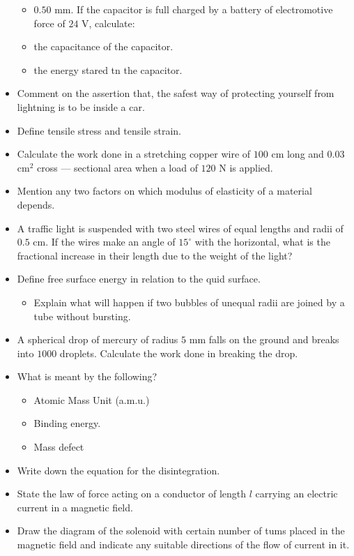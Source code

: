\documentclass{article}
\begin{document}
\begin{itemize}
\begin{itemize}
\item $ 0.50$ mm. If the capacitor is full charged by a battery of electromotive force of $ 24$ V, calculate:
\item the capacitance of the capacitor. 
\item the energy stared tn the capacitor. 
\end{itemize}
\item Comment on the assertion that, the safest way of protecting yourself from lightning is to be inside a car. 
\item Define tensile stress and tensile strain. 
\item Calculate the work done in a stretching copper wire of $ 100$ cm long and $ 0.03 $ cm$ ^{2}$ cross — sectional area when a load of $ 120$ N is applied. 
\item Mention any two factors on which modulus of elasticity of a material depends.
\item A traffic light is suspended with two steel wires of equal lengths and radii of $ 0.5$ cm. If the wires make an angle of $ 15^{\circ}$ with the horizontal, what is the fractional increase in their length due to the weight of the light? 
\item Define free surface energy in relation to the quid surface.
 \begin{itemize}
\item Explain what will happen if two bubbles of unequal radii are joined by a tube without bursting. 
\end{itemize}
\item A spherical drop of mercury of radius $ 5$ mm falls on the ground and breaks into $ 1000$ droplets. Calculate the work done in breaking the drop. 
\item What is meant by the following?
 \begin{itemize}
\item Atomic Mass Unit (a.m.u.)
\item Binding energy. 
\item Mass defect
\end{itemize}
\item Write down the equation for the disintegration.
\item State the law of force acting on a conductor of length $ l$ carrying an electric current in a magnetic field. 
\item Draw the diagram of the solenoid with certain number of tums placed in the magnetic field and indicate any suitable directions of the flow of current in it.

\end{itemize}
\end{document}
